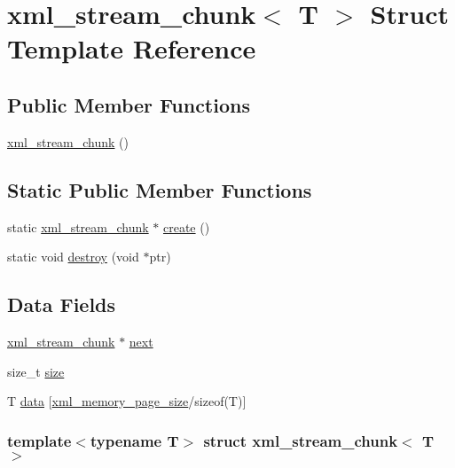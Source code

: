 \hypertarget{structxml__stream__chunk}{
\section{xml\_\-stream\_\-chunk$<$ T $>$ Struct Template Reference}
\label{structxml__stream__chunk}
}
\subsection*{Public Member Functions}
\begin{CompactItemize}
\item 
\hyperlink{structxml__stream__chunk_8b87fcb2074014dd252f752a95092337}{xml\_\-stream\_\-chunk} ()
\end{CompactItemize}
\subsection*{Static Public Member Functions}
\begin{CompactItemize}
\item 
static \hyperlink{structxml__stream__chunk}{xml\_\-stream\_\-chunk} $\ast$ \hyperlink{structxml__stream__chunk_92cffe33c529ff266329fd4afb59226d}{create} ()
\item 
static void \hyperlink{structxml__stream__chunk_4b812901d59950d48d539e5c8726a0e8}{destroy} (void $\ast$ptr)
\end{CompactItemize}
\subsection*{Data Fields}
\begin{CompactItemize}
\item 
\hyperlink{structxml__stream__chunk}{xml\_\-stream\_\-chunk} $\ast$ \hyperlink{structxml__stream__chunk_d00071f7340adb2bde7c4157d4100b3c}{next}
\item 
size\_\-t \hyperlink{structxml__stream__chunk_42618ba3b7bda1246cfc640149fc34eb}{size}
\item 
T \hyperlink{structxml__stream__chunk_365e2e228a0277467b25a0fea42b8518}{data} \mbox{[}\hyperlink{pugixml_8cpp_a040c77beb7349f7473f072b6dd364b9}{xml\_\-memory\_\-page\_\-size}/sizeof(T)\mbox{]}
\end{CompactItemize}
\subsubsection*{template$<$typename T$>$ struct xml\_\-stream\_\-chunk$<$ T $>$}



